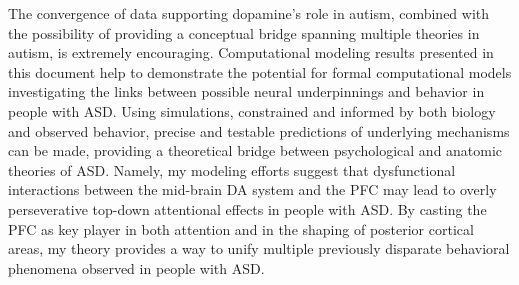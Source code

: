 The convergence of data supporting dopamine's role in autism, combined with the possibility of providing a conceptual bridge spanning multiple theories in autism, is extremely encouraging.  Computational modeling results presented in this document help to demonstrate the potential for formal computational models investigating the links between possible neural underpinnings and behavior in people with ASD.  Using simulations, constrained and informed by both biology and observed behavior, precise and testable predictions of underlying mechanisms can be made, providing a theoretical bridge between psychological and anatomic theories of ASD.   Namely, my modeling efforts suggest that dysfunctional interactions between the mid-brain DA system and the PFC may lead to overly perseverative top-down attentional effects in people with ASD.  By casting the PFC as key player in both attention and in the shaping of posterior cortical areas, my theory provides a way to unify multiple previously disparate behavioral phenomena observed in people with ASD.
